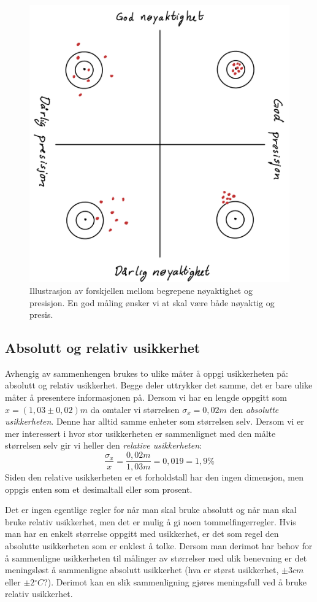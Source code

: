 \begin{figure}[htp]
	\begin{center}
		\includegraphics[width=.5\textwidth]{./presisjon}
	\end{center}
	\caption{Illustrasjon av forskjellen mellom begrepene nøyaktighet og presisjon. En god måling ønsker vi at skal være både nøyaktig og presis.}
	\label{fig:usikkerhet:presisjon}
\end{figure}


\subsection{Absolutt og relativ usikkerhet}
Avhengig av sammenhengen brukes to ulike måter å oppgi usikkerheten på: absolutt og relativ usikkerhet. Begge deler uttrykker det samme, det er bare ulike måter å presentere informasjonen på. Dersom vi har en lengde oppgitt som $x=(1,03\pm 0,02)\unit{m}$ da omtaler vi størrelsen $\sigma_x = 0,02\unit{m}$ den \emph{absolutte usikkerheten}. Denne har alltid samme enheter som størrelsen selv. Dersom vi er mer interessert i hvor stor usikkerheten er sammenlignet med den målte størrelsen selv gir vi heller den \emph{relative usikkerheten}: 
\begin{displaymath}
	\frac{\sigma_x}{x} = \frac{0,02\unit{m}}{1,03\unit{m}} = 0,019 = 1,9\%
\end{displaymath}
Siden den relative usikkerheten er et forholdstall har den ingen dimensjon, men oppgis enten som et desimaltall eller som prosent.

Det er ingen egentlige regler for når man skal bruke absolutt og når man skal bruke relativ usikkerhet, men det er mulig å gi noen tommelfingerregler. Hvis man har en enkelt størrelse oppgitt med usikkerhet, er det som regel den absolutte usikkerheten som er enklest å tolke. Dersom man derimot har behov for å sammenligne usikkerheten til målinger av størrelser med ulik benevning er det meningsløst å sammenligne absolutt usikkerhet (hva er størst usikkerhet, $\pm 3\unit{cm}$ eller $\pm 2\unit{^\circ C}$?). Derimot kan en slik sammenligning gjøres meningsfull ved å bruke relativ usikkerhet.

